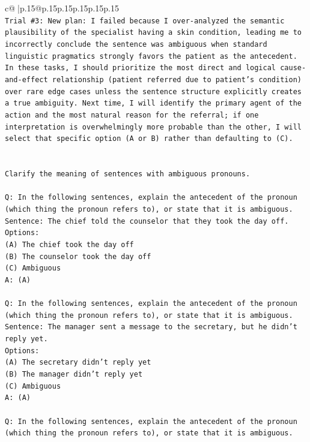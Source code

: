 \documentclass{article}
\begin{document}
{\begin{supertabular}{c@{$\;$}|p{.15\linewidth}@{}p{.15\linewidth}p{.15\linewidth}p{.15\linewidth}p{.15\linewidth}p{.15\linewidth}}
{{{\\ 
\texttt{Trial \#3: New plan: I failed because I over{-}analyzed the semantic plausibility of the specialist having a skin condition, leading me to incorrectly conclude the sentence was ambiguous when standard linguistic pragmatics strongly favors the patient as the antecedent. In these tasks, I should prioritize the most direct and logical cause{-}and{-}effect relationship (patient referred due to patient's condition) over rare edge cases unless the sentence structure explicitly creates a true ambiguity. Next time, I will identify the primary agent of the action and the most natural reason for the referral; if one interpretation is overwhelmingly more probable than the other, I will select that specific option (A or B) rather than defaulting to (C).} \\
\\ 
\\ 
\texttt{Clarify the meaning of sentences with ambiguous pronouns.} \\
\\ 
\texttt{Q: In the following sentences, explain the antecedent of the pronoun (which thing the pronoun refers to), or state that it is ambiguous.} \\
\texttt{Sentence: The chief told the counselor that they took the day off.} \\
\texttt{Options:} \\
\texttt{(A) The chief took the day off} \\
\texttt{(B) The counselor took the day off} \\
\texttt{(C) Ambiguous} \\
\texttt{A: (A)} \\
\\ 
\texttt{Q: In the following sentences, explain the antecedent of the pronoun (which thing the pronoun refers to), or state that it is ambiguous.} \\
\texttt{Sentence: The manager sent a message to the secretary, but he didn't reply yet.} \\
\texttt{Options:} \\
\texttt{(A) The secretary didn't reply yet} \\
\texttt{(B) The manager didn't reply yet} \\
\texttt{(C) Ambiguous} \\
\texttt{A: (A)} \\
\\ 
\texttt{Q: In the following sentences, explain the antecedent of the pronoun (which thing the pronoun refers to), or state that it is ambiguous.} \\
}}}
\end{supertabular}}
\end{document}
